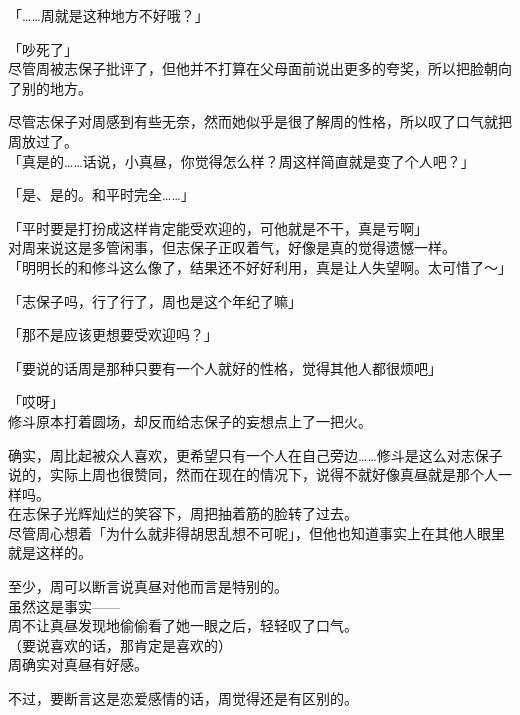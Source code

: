 「……周就是这种地方不好哦？」

「吵死了」\\

尽管周被志保子批评了，但他并不打算在父母面前说出更多的夸奖，所以把脸朝向了别的地方。

尽管志保子对周感到有些无奈，然而她似乎是很了解周的性格，所以叹了口气就把周放过了。\\

「真是的……话说，小真昼，你觉得怎么样？周这样简直就是变了个人吧？」

「是、是的。和平时完全……」

「平时要是打扮成这样肯定能受欢迎的，可他就是不干，真是亏啊」\\

对周来说这是多管闲事，但志保子正叹着气，好像是真的觉得遗憾一样。\\

「明明长的和修斗这么像了，结果还不好好利用，真是让人失望啊。太可惜了～」

「志保子吗，行了行了，周也是这个年纪了嘛」

「那不是应该更想要受欢迎吗？」

「要说的话周是那种只要有一个人就好的性格，觉得其他人都很烦吧」

「哎呀」\\

修斗原本打着圆场，却反而给志保子的妄想点上了一把火。

确实，周比起被众人喜欢，更希望只有一个人在自己旁边……修斗是这么对志保子说的，实际上周也很赞同，然而在现在的情况下，说得不就好像真昼就是那个人一样吗。\\

在志保子光辉灿烂的笑容下，周把抽着筋的脸转了过去。\\

尽管周心想着「为什么就非得胡思乱想不可呢」，但他也知道事实上在其他人眼里就是这样的。

至少，周可以断言说真昼对他而言是特别的。\\

虽然这是事实——\\

周不让真昼发现地偷偷看了她一眼之后，轻轻叹了口气。\\

（要说喜欢的话，那肯定是喜欢的）\\

周确实对真昼有好感。

不过，要断言这是恋爱感情的话，周觉得还是有区别的。\\

